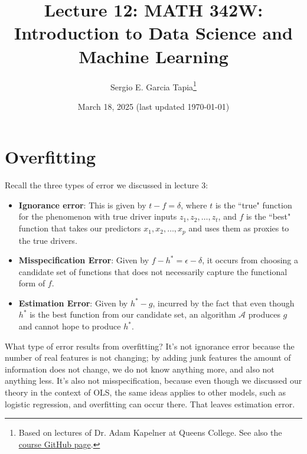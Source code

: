 \documentclass[12pt, a4paper]{article}
\title{Lecture 12: MATH 342W: Introduction to Data Science and Machine Learning}
\author{Sergio E. Garcia Tapia\thanks{Based on lectures of Dr. Adam Kapelner at Queens College.
See also the \href{https://github.com/kapelner/QC_MATH_342W_Spring_2025}{course GitHub page}.}}
\date{March 18, 2025 (last updated \today)}
\theoremstyle{definition}
\begin{document}
	\maketitle
	\section*{Overfitting}
	Recall the three types of error we discussed in lecture 3:
	\begin{itemize}
		\item \textbf{Ignorance error}: This is given by $t-f=\delta$, where $t$ is the ``true"
		function for the phenomenon with true driver inputs $z_1,z_2,\ldots,z_t$,
		and $f$ is the ``best" function that takes our predictors $x_1,x_2,\ldots,x_p$
		and uses them as proxies to the true drivers. 
		\item \textbf{Misspecification Error}: Given by $f-h^*=\epsilon-\delta$, it occurs
		from choosing a candidate set of functions that does not necessarily capture
		the functional form of $f$.
		\item \textbf{Estimation Error}: Given by $h^*-g$, incurred by the fact that
		even though $h^*$ is the best function from our candidate set, an algorithm
		$\mathcal{A}$ produces $g$ and cannot hope to produce $h^*$.
	\end{itemize}
	What type of error results from overfitting? It's not ignorance error because
	the number of real features is not changing; by adding junk features the amount
	of information does not change, we do not know anything more, and also not
	anything less. It's also not misspecification, because even though we discussed
	our theory in the context of OLS, the same ideas applies to other models, such
	as logistic regression, and overfitting can occur there. That leaves estimation error.
	
\end{document}
